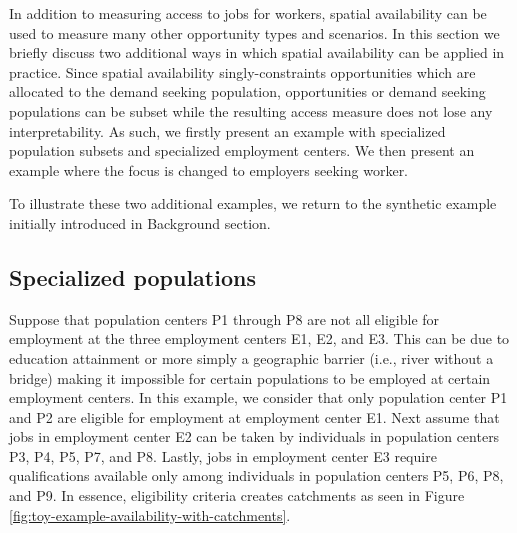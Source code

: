 \documentclass[]{elsarticle} %
\begin{document}
In addition to measuring access to jobs for workers, spatial
availability can be used to measure many other opportunity types and
scenarios. In this section we briefly discuss two additional ways in
which spatial availability can be applied in practice. Since spatial
availability singly-constraints opportunities which are allocated to the
demand seeking population, opportunities or demand seeking populations
can be subset while the resulting access measure does not lose any
interpretability. As such, we firstly present an example with
specialized population subsets and specialized employment centers. We
then present an example where the focus is changed to employers seeking
worker.

To illustrate these two additional examples, we return to the synthetic
example initially introduced in Background section.

\hypertarget{specialized-populations}{%
\subsection{Specialized populations}\label{specialized-populations}}

Suppose that population centers P1 through P8 are not all eligible for
employment at the three employment centers E1, E2, and E3. This can be
due to education attainment or more simply a geographic barrier (i.e.,
river without a bridge) making it impossible for certain populations to
be employed at certain employment centers. In this example, we consider
that only population center P1 and P2 are eligible for employment at
employment center E1. Next assume that jobs in employment center E2 can
be taken by individuals in population centers P3, P4, P5, P7, and P8.
Lastly, jobs in employment center E3 require qualifications available
only among individuals in population centers P5, P6, P8, and P9. In
essence, eligibility criteria creates catchments as seen in Figure
\ref{fig:toy-example-availability-with-catchments}.
\end{document}
